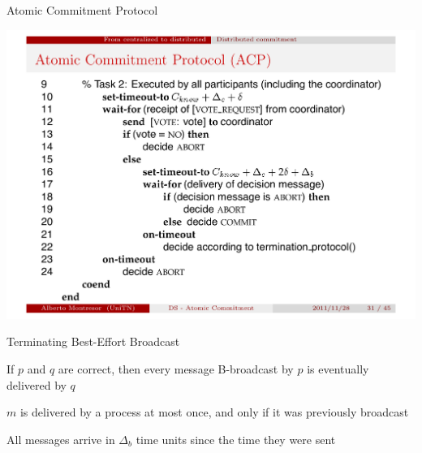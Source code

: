 \begin{frame}{Atomic Commitment Protocol}

\includegraphics[width=\textwidth]{alg2.pdf}

\end{frame}

\begin{frame}{Terminating Best-Effort Broadcast}
 
\begin{definition}
If $p$ and $q$ are correct, then every message B-broadcast by $p$ is eventually delivered by $q$
\end{definition}

\smallskip
\begin{definition}
$m$ is delivered by a process at most once, and only if it was previously broadcast
\end{definition}

\smallskip
\begin{definition}
All messages arrive in $\Delta_b$ time units since the time they were sent
\end{definition}
\end{frame}

